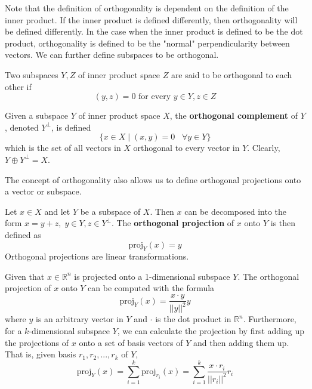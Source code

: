   Note that the definition of orthogonality is dependent on the definition of the inner product. If the inner product is defined differently, then orthogonality will be defined differently. In the case when the inner product is defined to be the dot product, orthogonality is defined to be the "normal" perpendicularity between vectors. We can further define subspaces to be orthogonal. 

  \begin{definition}
    Two subspaces $Y, Z$ of inner product space $Z$ are said to be orthogonal to each other if 
    \begin{equation}
      (y, z) = 0 \text{   for every } y \in Y, z \in Z
    \end{equation}
  \end{definition}

  \begin{definition}
    Given a subspace $Y$ of inner product space $X$, the \textbf{orthogonal complement} of $Y$, denoted $Y^\perp$, is defined
    \begin{equation}
      \{ x \in X \; | \; (x, y) = 0 \;\;\; \forall y \in Y\}
    \end{equation}
    which is the set of all vectors in $X$ orthogonal to every vector in $Y$. Clearly, $Y \oplus Y^\perp = X$. 
  \end{definition}

  The concept of orthogonality also allows us to define orthogonal projections onto a vector or subspace. 

  \begin{definition}
    Let $x \in X$ and let $Y$ be a subspace of $X$. Then $x$ can be decomposed into the form $x = y + z, \; y \in Y, z \in Y^\perp$. The \textbf{orthogonal projection} of $x$ onto $Y$ is then defined as 
    \begin{equation}
      \text{proj}_Y (x) = y
    \end{equation}
    Orthogonal projections are linear transformations. 
  \end{definition}

  \begin{theorem}
    Given that $x \in \mathbb{R}^n$ is projected onto a 1-dimensional subspace $Y$. The orthogonal projection of $x$ onto $Y$ can be computed with the formula 
    \begin{equation}
      \text{proj}_Y (x) = \frac{x \cdot y}{||y||^2} y
    \end{equation}
    where $y$ is an arbitrary vector in $Y$ and $\cdot$ is the dot product in $\mathbb{R}^n$. Furthermore, for a $k$-dimensional subspace $Y$, we can calculate the projection by first adding up the projections of $x$ onto a set of basis vectors of $Y$ and then adding them up. That is, given basis $r_1, r_2, ..., r_k$ of $Y$,
    \begin{equation}
        \text{proj}_Y (x) = \sum_{i=1}^k \text{proj}_{r_i} (x) = \sum_{i=1}^k \frac{x \cdot r_i}{||r_i||^2} r_i 
    \end{equation}
  \end{theorem}


